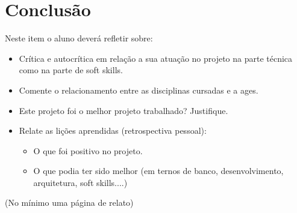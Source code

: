 \section[Conclusão]{Conclusão}

Neste item o aluno deverá refletir sobre:
\begin{itemize}
    \item Crítica e autocrítica em relação a sua atuação no projeto na parte técnica como na parte de soft skills.
    \item Comente o relacionamento entre as disciplinas cursadas e a \ac{ages}.
    \item Este projeto foi o melhor projeto trabalhado? Justifique.
    \item Relate as lições aprendidas (retrospectiva pessoal):
    \begin{itemize}
        \item O que foi positivo no projeto.
        \item O que podia ter sido melhor (em ternos de banco, desenvolvimento, arquitetura, soft skills....)
    \end{itemize}
\end{itemize}
(No mínimo uma página de relato)